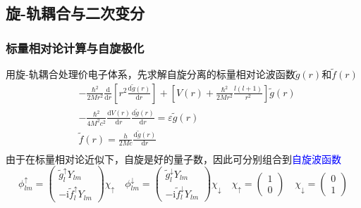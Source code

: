 \documentclass[cjk,slidestop,compress,mathserif,blue]{beamer}
\begin{document}
\subsection{旋-轨耦合与二次变分}
\frame
{
	\frametitle{标量相对论计算与自旋极化}
	用旋-轨耦合处理价电子体系，先求解自旋分离的标量相对论波函数$\tilde{g}(r)$和$\tilde{f}(r)$
	\begin{displaymath}
		\begin{aligned}
			&-\frac{\hbar^2}{2Mr^2}\frac{\mathrm{d}}{\mathrm{d}r}\left[ r^2\frac{\mathrm{d}\tilde{g}(r)}{\mathrm{d}r} \right]+\left[ V(r)+\frac{\hbar^2}{2Mr^2}\frac{l(l+1)}{r^2} \right]\tilde{g}(r)\\
			&-\frac{\hbar^2}{4M^2c^2}\frac{\mathrm{d}V(r)}{\mathrm{d}r}\frac{\mathrm{d}\tilde{g}(r)}{\mathrm{d}r}=\varepsilon\tilde{g}(r)\\
			&\tilde{f}(r)=\frac{h}{2Mc}\frac{\mathrm{d}\tilde{g}(r)}{\mathrm{d}r}\\
		\end{aligned}
	\end{displaymath}
	由于在标量相对论近似下，自旋是好的量子数，因此可分别组合到\textcolor{blue}{自旋波函数}
	\begin{displaymath}
		\phi_{lm}^{\uparrow}=\left( 
		\begin{matrix}
			\tilde{g}_l^{\uparrow}Y_{lm}\\
			-\mathrm{i}\tilde{f}_l^{\uparrow}Y_{lm}
		\end{matrix}
		\right)\chi_{\uparrow}\quad
		\phi_{lm}^{\downarrow}=\left( 
		\begin{matrix}
			\tilde{g}_l^{\downarrow}Y_{lm}\\
			-\mathrm{i}\tilde{f}_l^{\downarrow}Y_{lm}
		\end{matrix}
		\right)\chi_{\downarrow}\quad
		\chi_{\uparrow}=\left( 
		\begin{matrix}
			1\\
			0
		\end{matrix}
		\right)\quad
		\chi_{\downarrow}=\left( 
		\begin{matrix}
			0\\
			1
		\end{matrix}
		\right)
	\end{displaymath}
}
\end{document}
